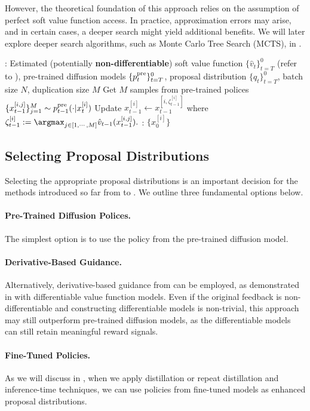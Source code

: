 However, the theoretical foundation of this approach relies on the assumption of perfect soft value function access. In practice, approximation errors may arise, and in certain cases, a deeper search might yield additional benefits. We will later explore deeper search algorithms, such as Monte Carlo Tree Search (MCTS), in .

\begin{algorithm}[!th]
\caption{Beam Search with Soft Value Functions \citep{li2024derivative}}\label{alg:decoding3}
\begin{algorithmic}[1]
     : Estimated (potentially \textbf{non-differentiable}) soft value function $\{\hat v_t\}_{t=T}^0$ (refer to ), pre-trained diffusion models $\{p^{\mathrm{pre}}_t\}_{t=T}^0$, proposal distribution $\{q_t\}_{t=T}^0$, batch size $N$, duplication size $M$
       \STATE  Get $M$ samples from pre-trained polices $\{x^{[i,j]}_{t-1}\}_{j=1}^{M} \sim p^{\mathrm{pre}}_{t-1}(\cdot| x^{[i]}_{t}) $ 
        \STATE Update $ x^{[i]}_{t-1}   \leftarrow  x^{[i, \zeta^{[i]}_{t-1}] }_{t-1} $ where  $ \textstyle \zeta^{[i]}_{t-1} :=  \argmax_{j \in [1,\cdots,M]} \hat v_{t-1}(x^{[i,j]}_{t-1}).$  \label{line:select}
     \ENDFOR
  : $\{ x^{[i]}_0\}$
\end{algorithmic}
\end{algorithm}


\subsection{Selecting Proposal Distributions} \label{sec:choice}

Selecting the appropriate proposal distributions is an important decision for the methods introduced so far from  to . We outline three fundamental options below.

\paragraph{Pre-Trained Diffusion Polices.} The simplest option is to use the policy from the pre-trained diffusion model.

\paragraph{Derivative-Based Guidance.} Alternatively, derivative-based guidance from  can be employed, as demonstrated in \citet{wu2024practical,phillips2024particle} with differentiable value function models. Even if the original feedback is non-differentiable and constructing differentiable models is non-trivial, this approach may still outperform pre-trained diffusion models, as the differentiable models can still retain meaningful reward signals.


{\paragraph{Fine-Tuned Policies.}  As we will discuss in , when we apply distillation or repeat distillation and inference-time techniques, we can use policies from fine-tuned models as enhanced proposal distributions. } 

